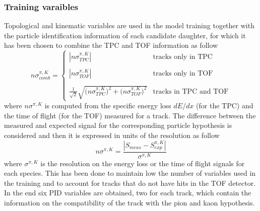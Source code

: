 \subsubsection{Training varaibles}
\label{sec:train_variables}
Topological and kinematic variables are used in the model training together with the particle identification 
information of each candidate daughter, for which it has been chosen to combine the TPC and TOF information as follow
\begin{equation}
  n\sigma_{comb}^{\pi,K} = 
  \begin{cases}
    |n\sigma_{TPC}^{\pi,K}| & \text{tracks only in TPC} \\
    \\[4pt]
    |n\sigma_{TOF}^{\pi,K}| & \text{tracks only in TOF} \\
    \\[4pt]
    \frac{1}{\sqrt{2}}\sqrt{\big(n\sigma_{TPC}^{\pi,K}\big)^2 + \big(n\sigma_{TOF}^{\pi,K}\big)^2} & \text{tracks in TPC and TOF}
  \end{cases} 
\end{equation}
where \(n\sigma^{\pi,K}\) is computed from the specific energy loss $dE/dx$ (for the TPC) and the time of flight (for the TOF) 
measured for a track. The difference between the measured and expected signal for the corresponding particle hypothesis 
is considered and then it is expressed in units of the resolution as follow
\begin{equation}
  n\sigma^{\pi,K} = \frac{|S_{meas} - S_{exp}^{\pi,K}|}{\sigma^{\pi,K}}
\end{equation}
where $\sigma^{\pi,K}$ is the resolution on the energy loss or the time of flight signals for each species. 
This has been done to maintain low the number of variables used in the training and to account for tracks that do not have
hits in the TOF detector. In the end six PID variables are obtained, two for each track, which contain the information on the 
compatibility of the track with the pion and kaon hypothesis.\\

